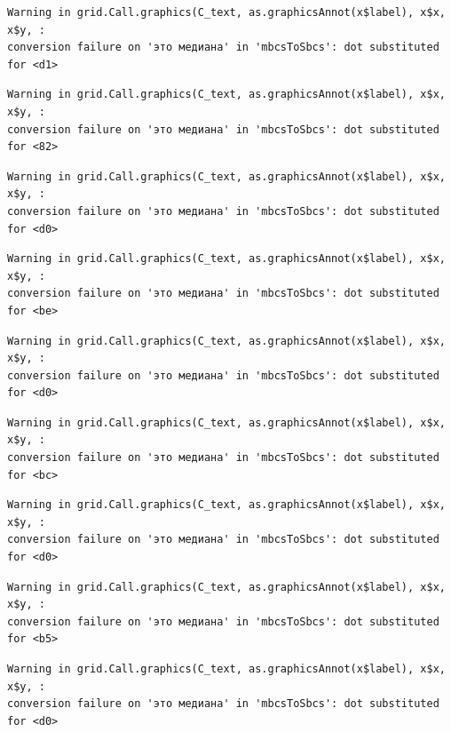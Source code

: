 \documentclass[
  letterpaper,
]{scrbook}
\theoremstyle{definition}
\theoremstyle{remark}
\begin{document}
\begin{verbatim}
Warning in grid.Call.graphics(C_text, as.graphicsAnnot(x$label), x$x, x$y, :
conversion failure on 'это медиана' in 'mbcsToSbcs': dot substituted for <d1>
\end{verbatim}

\begin{verbatim}
Warning in grid.Call.graphics(C_text, as.graphicsAnnot(x$label), x$x, x$y, :
conversion failure on 'это медиана' in 'mbcsToSbcs': dot substituted for <82>
\end{verbatim}

\begin{verbatim}
Warning in grid.Call.graphics(C_text, as.graphicsAnnot(x$label), x$x, x$y, :
conversion failure on 'это медиана' in 'mbcsToSbcs': dot substituted for <d0>
\end{verbatim}

\begin{verbatim}
Warning in grid.Call.graphics(C_text, as.graphicsAnnot(x$label), x$x, x$y, :
conversion failure on 'это медиана' in 'mbcsToSbcs': dot substituted for <be>
\end{verbatim}

\begin{verbatim}
Warning in grid.Call.graphics(C_text, as.graphicsAnnot(x$label), x$x, x$y, :
conversion failure on 'это медиана' in 'mbcsToSbcs': dot substituted for <d0>
\end{verbatim}

\begin{verbatim}
Warning in grid.Call.graphics(C_text, as.graphicsAnnot(x$label), x$x, x$y, :
conversion failure on 'это медиана' in 'mbcsToSbcs': dot substituted for <bc>
\end{verbatim}

\begin{verbatim}
Warning in grid.Call.graphics(C_text, as.graphicsAnnot(x$label), x$x, x$y, :
conversion failure on 'это медиана' in 'mbcsToSbcs': dot substituted for <d0>
\end{verbatim}

\begin{verbatim}
Warning in grid.Call.graphics(C_text, as.graphicsAnnot(x$label), x$x, x$y, :
conversion failure on 'это медиана' in 'mbcsToSbcs': dot substituted for <b5>
\end{verbatim}

\begin{verbatim}
Warning in grid.Call.graphics(C_text, as.graphicsAnnot(x$label), x$x, x$y, :
conversion failure on 'это медиана' in 'mbcsToSbcs': dot substituted for <d0>
\end{verbatim}
\end{document}
